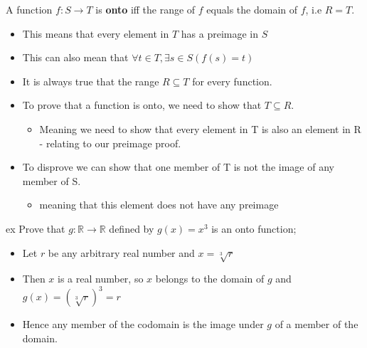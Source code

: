 \documentclass[12pt, letterpaper]{article}
\newcommand{\exheader}[1][ex]{{\tiny{#1}\normalsize}}
\begin{document}
A function $f: S \rightarrow T$ is \textbf{onto} iff the range of $f$ equals the domain of $f$, i.e $R = T$.
\begin{itemize}[leftmargin=*, label={}]
	\item This means that every element in $T$ has a preimage in $S$
	\item This can also mean that $\forall t \in T, \exists s \in S (f(s) = t)$
	\item It is always true that the range $R \subseteq T$ for every function.
	\item To prove that a function is onto, we need to show that $T \subseteq R$.
	\begin{itemize}
		\item {\small Meaning we need to show that every element in T is also an element in R - relating to our preimage proof.}
	\end{itemize}
	\item To disprove we can show that one member of T is not the image of any member of S.
	\begin{itemize}
		\item {\small meaning that this element does not have any preimage}
	\end{itemize}
\end{itemize}
\bigbreak
\exheader[ex] Prove that $g: \mathbb{R} \rightarrow \mathbb{R}$ defined by $g(x) = x^3$ is an onto function;
\begin{itemize}[leftmargin=*, label={}]
	\item Let $r$ be any arbitrary real number and $x = \sqrt[3]{r}$
	\item Then $x$ is a real number, so $x$ belongs to the domain of $g$ and $g(x) = \left( \sqrt[3]{r} \right)^3 = r$
	\item Hence any member of the codomain is the image under $g$ of a member of the domain.
\end{itemize}

\pagebreak
\end{document}
